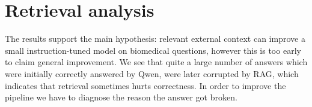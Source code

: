 \documentclass{article}
\begin{document}
\begin{table}[!htb]
\centering
\small
\setlength{\tabcolsep}{3pt}
\caption{Results on the complete MedMCQA validation split for both retrieval-query
modes. ``Fixed'' and ``Broken'' are measured relative to the closed-book baseline.}
\label{tab:full-results}
\end{table}


\section{Retrieval analysis}
The results support the main hypothesis: relevant external context can improve a
small instruction-tuned model on biomedical questions, however this is too early to claim general improvement.
We see that quite a large number of answers which were initially correctly 
answered by Qwen, were later corrupted by RAG, which indicates that retrieval sometimes hurts correctness. 
In order to improve the pipeline we have to diagnose the reason the answer got broken.
\end{document}
